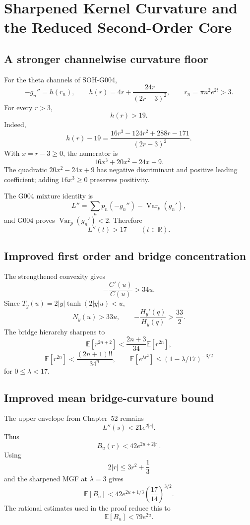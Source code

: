 \chapter{Sharpened Kernel Curvature and the Reduced Second-Order Core}
\label{chap:g024-sharpened-curvature}


\section{A stronger channelwise curvature floor}
For the theta channels of SOH-G004,
\[
-g_n''=h(r_n),
\qquad
h(r)=4r+\frac{24r}{(2r-3)^2},
\qquad
r_n=\pi n^2e^{2t}>3.
\]
For every $r>3$,
\[
\boxed{h(r)>19.}
\]
Indeed,
\[
h(r)-19=\frac{16r^3-124r^2+288r-171}{(2r-3)^2}.
\]
With $x=r-3\ge0$, the numerator is
\[
16x^3+20x^2-24x+9.
\]
The quadratic $20x^2-24x+9$ has negative discriminant and positive leading coefficient; adding $16x^3\ge0$ preserves positivity.

The G004 mixture identity is
\[
L''=\sum_np_n(-g_n'')-\operatorname{Var}_p(g_n'),
\]
and G004 proves $\operatorname{Var}_p(g_n')<2$. Therefore
\[
\boxed{L''(t)>17\qquad(t\in\mathbb R).}
\]

\section{Improved first order and bridge concentration}
The strengthened convexity gives
\[
-\frac{C'(u)}{C(u)}>34u.
\]
Since $T_y(u)=2|y|\tanh(2|y|u)<u$,
\[
\boxed{N_y(u)>33u},
\qquad
\boxed{-\frac{H_y'(q)}{H_y(q)}>\frac{33}{2}}.
\]
The bridge hierarchy sharpens to
\[
\boxed{\mathbb E[r^{2n+2}]<\frac{2n+3}{34}\mathbb E[r^{2n}]},
\]
\[
\boxed{\mathbb E[r^{2n}]<\frac{(2n+1)!!}{34^n}},
\qquad
\boxed{\mathbb E[e^{\lambda r^2}]\le(1-\lambda/17)^{-3/2}}
\]
for $0\le\lambda<17$.

\section{Improved mean bridge-curvature bound}
The upper envelope from Chapter~52 remains
\[
L''(s)<21e^{2|s|}.
\]
Thus
\[
B_u(r)<42e^{2u+2|r|}.
\]
Using
\[
2|r|\le3r^2+\frac13
\]
and the sharpened MGF at $\lambda=3$ gives
\[
\mathbb E[B_u]<42e^{2u+1/3}\left(\frac{17}{14}\right)^{3/2}.
\]
The rational estimates used in the proof reduce this to
\[
\boxed{\mathbb E[B_u]<79e^{2u}}.
\]

